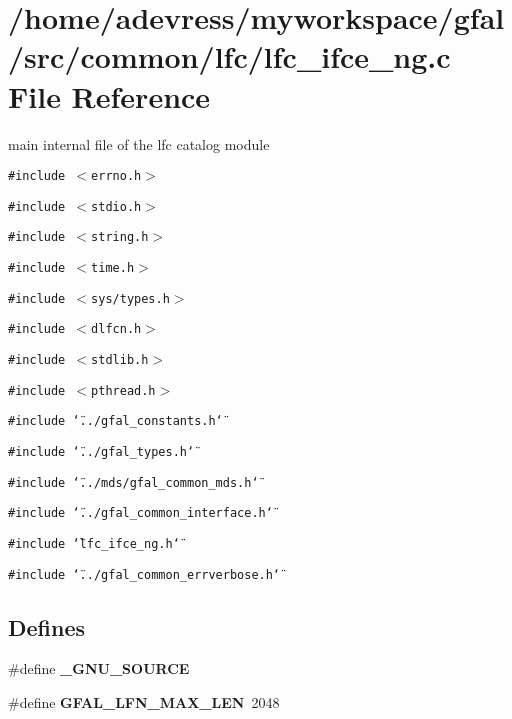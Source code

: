 \section{/home/adevress/myworkspace/gfal/src/common/lfc/lfc\_\-ifce\_\-ng.c File Reference}
\label{lfc__ifce__ng_8c}
main internal file of the lfc catalog module 

{\tt \#include $<$errno.h$>$}\par
{\tt \#include $<$stdio.h$>$}\par
{\tt \#include $<$string.h$>$}\par
{\tt \#include $<$time.h$>$}\par
{\tt \#include $<$sys/types.h$>$}\par
{\tt \#include $<$dlfcn.h$>$}\par
{\tt \#include $<$stdlib.h$>$}\par
{\tt \#include $<$pthread.h$>$}\par
{\tt \#include \char`\"{}../gfal\_\-constants.h\char`\"{}}\par
{\tt \#include \char`\"{}../gfal\_\-types.h\char`\"{}}\par
{\tt \#include \char`\"{}../mds/gfal\_\-common\_\-mds.h\char`\"{}}\par
{\tt \#include \char`\"{}../gfal\_\-common\_\-interface.h\char`\"{}}\par
{\tt \#include \char`\"{}lfc\_\-ifce\_\-ng.h\char`\"{}}\par
{\tt \#include \char`\"{}../gfal\_\-common\_\-errverbose.h\char`\"{}}\par
\subsection*{Defines}
\begin{CompactItemize}
\item 
\#define \textbf{\_\-GNU\_\-SOURCE}\label{lfc__ifce__ng_8c_53abf256730d533302d1910e5fb61efe}

\item 
\#define \textbf{GFAL\_\-LFN\_\-MAX\_\-LEN}~2048\label{lfc__ifce__ng_8c_74cbac9029a516b4ae28199debf71835}

\end{CompactItemize}
